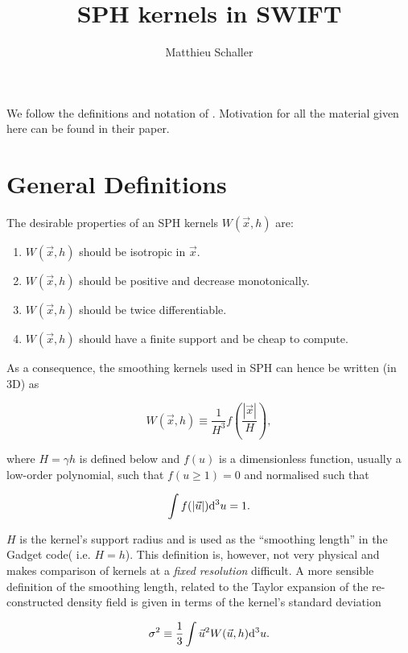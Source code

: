 \documentclass[usenatbib, useAMS,a4paper]{mnras}
\title{SPH kernels in SWIFT}
\author{Matthieu Schaller}
\begin{document}
\maketitle

We follow the definitions and notation of
\cite{Dehnen2012}. Motivation for all the material given here can be
found in their paper.

\section{General Definitions}

The desirable properties of an SPH kernels $W(\vec{x},h)$ are:
\begin{enumerate}
\item $W(\vec{x},h)$ should be isotropic in $\vec{x}$.
\item $W(\vec{x},h)$ should be positive and decrease monotonically.
\item $W(\vec{x},h)$ should be twice differentiable.
\item $W(\vec{x},h)$ should have a finite support and be cheap to
  compute.
\end{enumerate}

As a consequence, the smoothing kernels used in SPH can
hence be written (in 3D) as

\begin{equation}
 W(\vec{x},h) \equiv \frac{1}{H^3}f\left(\frac{|\vec{x}|}{H}\right),
\end{equation}

where $H=\gamma h$ is defined below and $f(u)$ is a dimensionless
function, usually a low-order polynomial, such that $f(u \geq 1) = 0$
and normalised such that

\begin{equation}
  \int f(|\vec{u}|){\rm d}^3u = 1.
\end{equation}

$H$ is the kernel's support radius and is used as the ``smoothing
length'' in the Gadget code( {i.e.} $H=h$). This definition is,
however, not very physical and makes comparison of kernels at a
\emph{fixed resolution} difficult. A more sensible definition of the
smoothing length, related to the Taylor expansion of the
re-constructed density field is given in terms of the kernel's
standard deviation

\begin{equation}
  \sigma^2 \equiv \frac{1}{3}\int \vec{u}^2 W(\vec{u},h) {\rm d}^3u.
  \label{eq:sph:sigma}
\end{equation}
\end{document}
